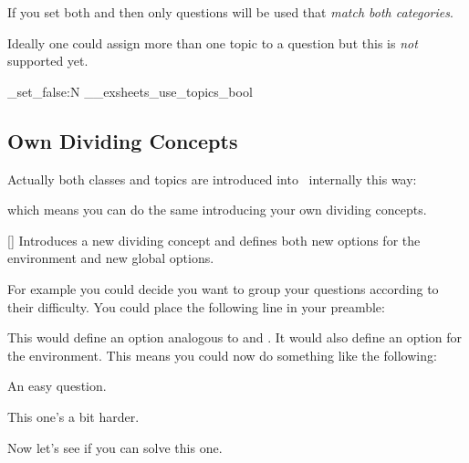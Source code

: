 \documentclass[load-preamble+,scrartcl={DIV10}]{cnltx-doc}
\begin{document}
If you set both  and  then only
questions will be used that \emph{match both categories}.

Ideally one could assign more than one topic to a question but this is
\emph{not} supported yet.

\ExplSyntaxOn
 \bool_set_false:N \g__exsheets_use_topics_bool
\ExplSyntaxOff

\subsection{Own Dividing Concepts}
\noindent{}Actually both classes and topics are introduced
into \ExSheets\ internally this way:
\begin{sourcecode}
\end{sourcecode}
which means you can do the same introducing your own dividing concepts.
\begin{commands}
  []
    Introduces a new dividing concept and defines both new options for the
     environment and new global options.
\end{commands}

For example you could decide you want to group your questions according to
their difficulty.  You could place the following line in your preamble:
\begin{sourcecode}
\end{sourcecode}
This would define an option  analogous to
 and .  It would also define an option
 for the  environment.  This means you could
now do something like the following:
\begin{example}
  \begin{question}[difficulty=easy]
    An easy question.
  \end{question}
  \begin{question}[difficulty=medium]
    This one's a bit harder.
  \end{question}
  \begin{question}[difficulty=hard]
    Now let's see if you can solve this one.
  \end{question}
\end{example}
\end{document}
